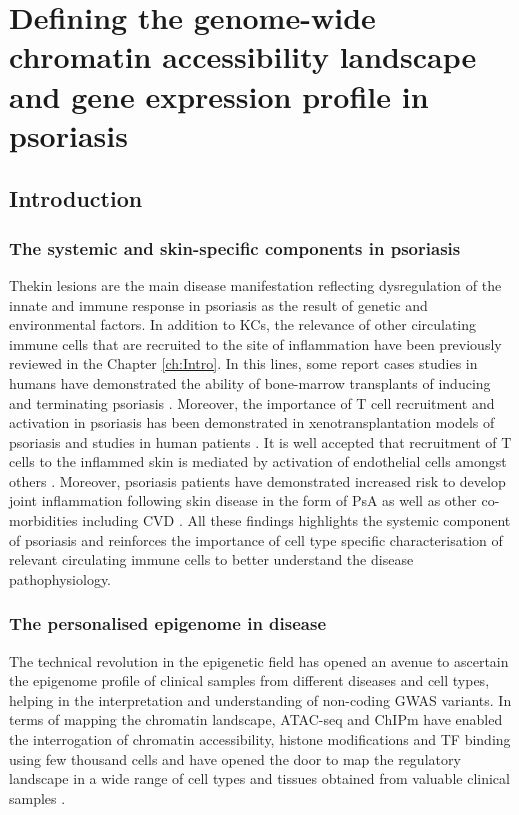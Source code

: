 \chapter{Defining the genome-wide chromatin accessibility landscape and gene expression profile in psoriasis}
\label{ch:Results 2}


\section{Introduction}

\subsection{The systemic and skin-specific components in psoriasis}
Thekin lesions are the main disease manifestation reflecting dysregulation of the innate and immune response in psoriasis as the result of genetic and environmental factors. In addition to KCs, the relevance of other circulating immune cells that are recruited to the site of inflammation have been previously reviewed in the Chapter \ref{ch:Intro}. In this lines, some report cases studies in humans have demonstrated the ability of bone-marrow transplants of inducing and terminating psoriasis \parencite{Eedy1990, Gardembas1990}. Moreover, the importance of T cell recruitment and activation in psoriasis has been demonstrated in xenotransplantation models of psoriasis and studies in human patients \parencite{Wrone-Smith1996,Nickoloff1999,Baker1984}. It is well accepted that recruitment of T cells to the inflammed skin is mediated by activation of endothelial cells amongst others \parencite{Meglio2014}. Moreover, psoriasis patients have demonstrated increased risk to develop joint inflammation following skin disease in the form of PsA as well as other co-morbidities including CVD \parencite{Ibrahim2009,Shapiro2007}. All these findings highlights the systemic component of psoriasis and reinforces the importance of cell type specific characterisation of relevant circulating immune cells to better understand the disease pathophysiology.


\subsection{The personalised epigenome in disease}

The technical revolution in the epigenetic field has opened an avenue to ascertain the epigenome profile of clinical samples from different diseases and cell types, helping in the interpretation and understanding of non-coding GWAS variants. In terms of mapping the chromatin landscape, ATAC-seq and ChIPm have enabled the interrogation of chromatin accessibility, histone modifications and TF binding using few thousand cells and have opened the door to map the regulatory landscape in a wide range of cell types and tissues obtained from valuable clinical samples \parencite{Buenrostro2013, Schmidl2015}. 

